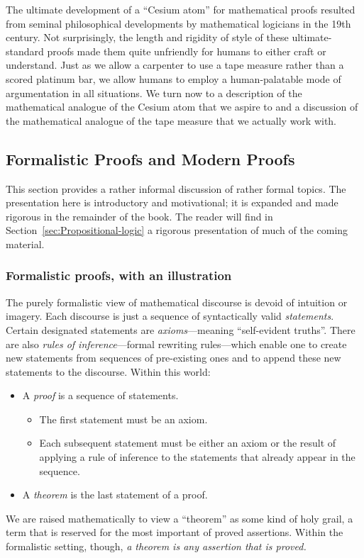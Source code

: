 The ultimate development of a ``Cesium atom'' for mathematical proofs resulted from seminal philosophical developments by mathematical logicians in the 19th century.  Not surprisingly, the length and rigidity of style of these ultimate-standard proofs made them quite unfriendly for humans to either craft or understand.  Just as we allow a carpenter to use a tape measure rather than a scored platinum bar, we allow humans to employ a human-palatable mode of argumentation in all situations.  We turn now to a description of the mathematical analogue of the Cesium atom that we aspire to and a discussion of the mathematical analogue of the tape measure that we actually work with.


\subsection{Formalistic Proofs and Modern Proofs}
\label{sec:classical-v-modern-proofs}

This section provides a rather informal discussion of rather formal topics.  The presentation here is introductory and motivational; it is expanded and made rigorous in the remainder of the book.  The reader will find in Section~\ref{sec:Propositional-logic} a rigorous presentation of much of the coming material.

\subsubsection{Formalistic proofs, with an illustration}
\label{sec:formal-proof}

The purely formalistic view of mathematical discourse is devoid of intuition or imagery.  Each discourse is just a sequence of syntactically valid {\it statements}.  Certain designated statements are {\em axioms}---meaning ``self-evident truths''.  There are also {\em rules of inference}---formal rewriting rules---which enable one to create new statements from sequences of pre-existing ones and to append these new statements to the discourse.  Within this world:
\begin{itemize}
\item
A {\em proof} is a sequence of statements.
  \begin{itemize}
  \item
The first statement must be an axiom.
  \item
Each subsequent statement must be either an axiom or the result of applying a rule of inference to the statements that already appear in the sequence.
  \end{itemize}
\item
A {\em theorem} is the last statement of a proof.
\end{itemize}
We are raised mathematically to view a ``theorem'' as some kind of holy grail, a term that is reserved for the most important of proved assertions.  Within the formalistic setting, though, {\em a theorem is any assertion that is proved.}

